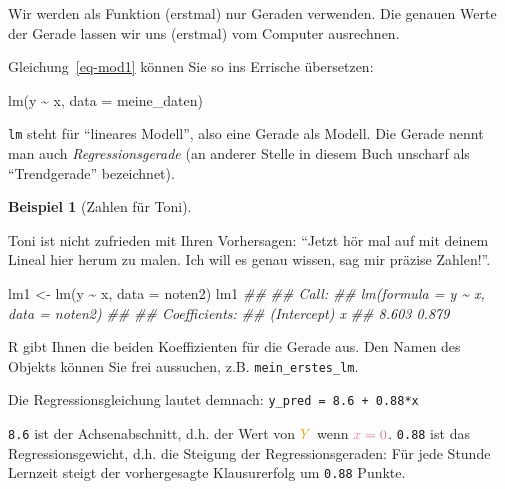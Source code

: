 \documentclass[
  a4paper,
]{scrbook}
\newenvironment{Shaded}{\begin{snugshade}}{\end{snugshade}}
\newcommand{\AttributeTok}[1]{\textcolor[rgb]{0.40,0.45,0.13}{#1}}
\newcommand{\DocumentationTok}[1]{\textcolor[rgb]{0.37,0.37,0.37}{\textit{#1}}}
\newcommand{\FunctionTok}[1]{\textcolor[rgb]{0.28,0.35,0.67}{#1}}
\newcommand{\NormalTok}[1]{\textcolor[rgb]{0.00,0.23,0.31}{#1}}
\newcommand{\OtherTok}[1]{\textcolor[rgb]{0.00,0.23,0.31}{#1}}
\newcommand{\SpecialCharTok}[1]{\textcolor[rgb]{0.37,0.37,0.37}{#1}}
\theoremstyle{definition}
\newtheorem{example}{Beispiel}[chapter]
\theoremstyle{definition}
\theoremstyle{definition}
\theoremstyle{remark}
\begin{document}
Wir werden als Funktion (erstmal) nur Geraden verwenden. Die genauen
Werte der Gerade lassen wir uns (erstmal) vom Computer ausrechnen.

Gleichung~\ref{eq-mod1} können Sie so ins Errische übersetzen:

\begin{Shaded}
\begin{Highlighting}[]
\FunctionTok{lm}\NormalTok{(y }\SpecialCharTok{\textasciitilde{}}\NormalTok{ x, }\AttributeTok{data =}\NormalTok{ meine\_daten)}
\end{Highlighting}
\end{Shaded}

\texttt{lm} steht für ``lineares Modell'', also eine Gerade als Modell.
Die Gerade nennt man auch \emph{Regressionsgerade} (an anderer Stelle in
diesem Buch unscharf als ``Trendgerade'' bezeichnet).

\begin{example}[Zahlen für
Toni]\protect\hypertarget{exm-noten5}{}\label{exm-noten5}

Toni ist nicht zufrieden mit Ihren Vorhersagen: ``Jetzt hör mal auf mit
deinem Lineal hier herum zu malen. Ich will es genau wissen, sag mir
präzise Zahlen!''.

\end{example}

\begin{Shaded}
\begin{Highlighting}[]
\NormalTok{lm1 }\OtherTok{\textless{}{-}} \FunctionTok{lm}\NormalTok{(y }\SpecialCharTok{\textasciitilde{}}\NormalTok{ x, }\AttributeTok{data =}\NormalTok{ noten2)}
\NormalTok{lm1}
\DocumentationTok{\#\# }
\DocumentationTok{\#\# Call:}
\DocumentationTok{\#\# lm(formula = y \textasciitilde{} x, data = noten2)}
\DocumentationTok{\#\# }
\DocumentationTok{\#\# Coefficients:}
\DocumentationTok{\#\# (Intercept)            x  }
\DocumentationTok{\#\#       8.603        0.879}
\end{Highlighting}
\end{Shaded}

R gibt Ihnen die beiden Koeffizienten für die Gerade aus. Den Namen des
Objekts können Sie frei aussuchen, z.B. \texttt{mein\_erstes\_lm}.

Die Regressionsgleichung lautet demnach:
\texttt{y\_pred\ =\ 8.6\ +\ 0.88*x}

\texttt{8.6} ist der Achsenabschnitt, d.h. der Wert von
\(\color{ycol}{Y}\) wenn \(\color{xcol}{x}=0\). \texttt{0.88} ist das
Regressionsgewicht, d.h. die Steigung der Regressionsgeraden: Für jede
Stunde Lernzeit steigt der vorhergesagte Klausurerfolg um \texttt{0.88}
Punkte.
\end{document}
